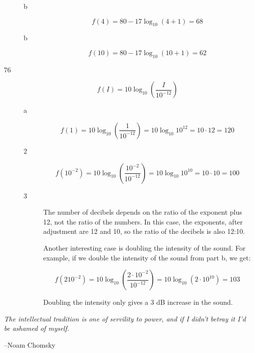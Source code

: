 \documentclass[fleqn,addpoints]{exam}
\begin{document}
\begin{description}
\begin{description}
\item[b] 
\[
  f(4) = 80 - 17 \log_{10}(4 + 1) = 68
\]

\item[b] 
\[
  f(10) = 80 - 17 \log_{10}(10 + 1) = 62
\]

\end{description}

\item[76]

\[
  f(I) = 10 \log_{10} \left( \frac{I}{10^{-12}} \right)
\]

\begin{description}
\item[a]
\[
  f(1) = 10 \log_{10} \left( \frac{1}{10^{-12}} \right) = 10 \log_{10} 10^{12} = 10 \cdot 12 = 120
\]

\item[2]
\[
  f(10^{-2}) = 10 \log_{10} \left( \frac{10^{-2}}{10^{-12}} \right) = 10 \log_{10} 10^{10} = 10 \cdot 10 = 100
\]

\item[3]
The number of decibels depends on the ratio of the exponent plus 12, not the ratio of the numbers.  In this
case, the exponents, after adjustment are 12 and 10, so the ratio of the decibels is also 12:10.

Another interesting case is doubling the intensity of the sound.  For example, if we double the intensity of the sound
from part b, we get:

\[
  f(210^{-2}) = 10 \log_{10} \left( \frac{2 \cdot 10^{-2}}{10^{-12}} \right) = 10 \log_{10}(2 \cdot 10^{10}) = 103
\]

Doubling the intensity only gives a 3 dB increase in the sound.


\end{description}

\end{description}

\fi

\ifprintanswers
\else

\vspace{3 in}

{\em The intellectual tradition is one of servility to power, and if I didn't betray it I'd be ashamed of myself.}

\vspace{.1 cm}
\hspace{1 cm} --Noam Chomsky
\fi
\end{document}

